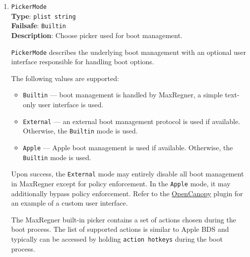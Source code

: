 \documentclass[]{article}
\providecommand{\tightlist}{%
  \setlength{\itemsep}{0pt}\setlength{\parskip}{0pt}}
\begin{document}
\begin{enumerate}
  For the macOS bootloader, screen reader preference is set in the \texttt{preferences.efires}
  archive in the \texttt{isVOEnabled.int32} file and is controlled by the operating system.
  For MaxRegner screen reader support, this option is an independent equivalent.
  Toggling screen reader support in both the MaxRegner picker and the macOS bootloader
  FileVault 2 login window can also be done by using the \texttt{Command} + \texttt{F5} key
  combination.

  \emph{Note}: The screen reader requires working audio support. Refer to the
  \hyperref[uefiaudioprops]{\texttt{UEFI Audio Properties}} section for details.

\item
  \texttt{PickerMode}\\
  \textbf{Type}: \texttt{plist\ string}\\
  \textbf{Failsafe}: \texttt{Builtin}\\
  \textbf{Description}: Choose picker used for boot management.

  \texttt{PickerMode} describes the underlying boot management with
  an optional user interface responsible for handling boot options.

  The following values are supported:

  \begin{itemize}
  \tightlist
  \item \texttt{Builtin} --- boot management is handled by MaxRegner, a simple
  text-only user interface is used.
  \item \texttt{External} --- an external boot management protocol is used
  if available. Otherwise, the \texttt{Builtin} mode is used.
  \item \texttt{Apple} --- Apple boot management is used if available.
  Otherwise, the \texttt{Builtin} mode is used.
  \end{itemize}

  Upon success, the \texttt{External} mode may entirely disable all boot management
  in MaxRegner except for policy enforcement. In the \texttt{Apple} mode, it may
  additionally bypass policy enforcement. Refer to the \hyperref[ueficanopy]{OpenCanopy}
  plugin for an example of a custom user interface.

  The MaxRegner built-in picker contains a set of actions chosen during the boot process.
  The list of supported actions is similar to Apple BDS and typically can be accessed by
  holding \texttt{action hotkeys} during the boot process.


\end{enumerate}
\end{document}
